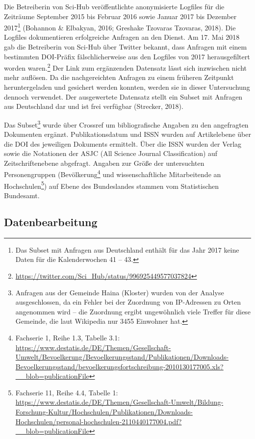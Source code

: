 \documentclass[a4paper,
fontsize=11pt,
oneside,
numbers=noperiodatend,
parskip=half-,
bibliography=totoc,
final
]{scrartcl}
\begin{document}
Die Betreiberin von Sci-Hub veröffentlichte anonymisierte Logfiles für
die Zeiträume September 2015 bis Februar 2016 sowie Januar 2017 bis
Dezember 2017\footnote{Das Subset mit Anfragen aus Deutschland enthält
  für das Jahr 2017 keine Daten für die Kalenderwochen 41 -- 43.}
(Bohannon \& Elbakyan, 2016; Greshake Tzovaras Tzovaras, 2018). Die
Logfiles dokumentieren erfolgreiche Anfragen an den Dienst. Am 17. Mai
2018 gab die Betreiberin von Sci-Hub über Twitter bekannt, dass Anfragen
mit einem bestimmten DOI-Präfix fälschlicherweise aus den Logfiles von
2017 herausgefiltert worden waren.\footnote{\url{https://twitter.com/Sci_Hub/status/996925449577037824}}
Der Link zum ergänzenden Datensatz lässt sich inzwischen nicht mehr
auflösen. Da die nachgereichten Anfragen zu einem früheren Zeitpunkt
heruntergeladen und gesichert werden konnten, werden sie in dieser
Untersuchung dennoch verwendet. Der ausgewertete Datensatz stellt ein
Subset mit Anfragen aus Deutschland dar und ist frei verfügbar
(Strecker, 2018).

Das Subset\footnote{Anfragen aus der Gemeinde Haina (Kloster) wurden von
  der Analyse ausgeschlossen, da ein Fehler bei der Zuordnung von
  IP-Adressen zu Orten angenommen wird -- die Zuordnung ergibt
  ungewöhnlich viele Treffer für diese Gemeinde, die laut Wikipedia nur
  3455 Einwohner hat.} wurde über Crossref um bibliografische Angaben zu
den angefragten Dokumenten ergänzt. Publikationsdatum und ISSN wurden
auf Artikelebene über die DOI des jeweiligen Dokuments ermittelt. Über
die ISSN wurden der Verlag sowie die Notationen der ASJC (All Science
Journal Classification) auf Zeitschriftenebene abgefragt. Angaben zur
Größe der untersuchten Personengruppen (Bevölkerung\footnote{Fachserie
  1, Reihe 1.3, Tabelle 3.1:
  \url{https://www.destatis.de/DE/Themen/Gesellschaft-Umwelt/Bevoelkerung/Bevoelkerungsstand/Publikationen/Downloads-Bevoelkerungsstand/bevoelkerungsfortschreibung-2010130177005.xls?__blob=publicationFile}}
und wissenschaftliche Mitarbeitende an Hochschulen\footnote{Fachserie
  11, Reihe 4.4, Tabelle 1:
  \url{https://www.destatis.de/DE/Themen/Gesellschaft-Umwelt/Bildung-Forschung-Kultur/Hochschulen/Publikationen/Downloads-Hochschulen/personal-hochschulen-2110440177004.pdf?__blob=publicationFile}})
auf Ebene des Bundeslandes stammen vom Statistischen Bundesamt.

\hypertarget{datenbearbeitung}{%
\subsection{Datenbearbeitung}\label{datenbearbeitung}}
\end{document}
